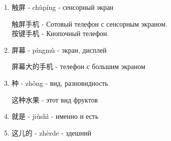 \begin{newwords}
\begin{enumerate}
\begin{example}
	\end{example}
	\begin{newgraphem}
		虫 - chóng - насекомое
	\end{newgraphem}
	\item 触屏 - chùpíng - сенсорный экран
	\begin{example}\hfill\break
		触屏手机 - Сотовый телефон с сенсорным экраном.\\
		按键手机 - Кнопочный телефон.
	\end{example}
	\item 屏幕 - píngmù - экран, дисплей
	\begin{example}\hfill\break
		屏幕大的手机 - телефон с большим экраном
	\end{example}
	\item 种 - zhǒng - вид, разновидность
	\begin{example}\hfill\break
		这种水果 - этот вид фруктов
	\end{example}
	\item 就是 - jiùshì - именно и есть
	\item 这儿的 - zhèrde - здешний
	\end{enumerate}
\end{newwords}
